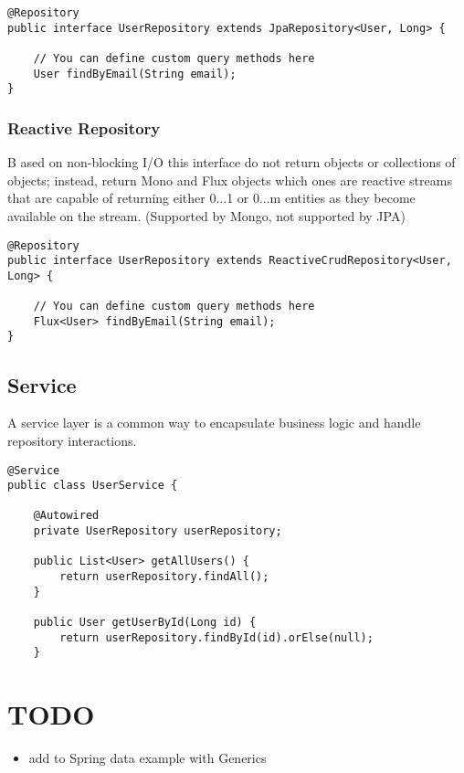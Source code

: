 \documentclass[a4paper, 12pt]{article}
\begin{document}
    \begin{lstlisting}
@Repository
public interface UserRepository extends JpaRepository<User, Long> {

    // You can define custom query methods here
    User findByEmail(String email);
}
    \end{lstlisting}

    \subsubsection{Reactive Repository}
    B ased on non-blocking I/O this interface do not
    return objects or collections of objects; instead, return Mono and Flux objects which ones are reactive streams that are
    capable of returning either 0...1 or 0...m entities as they become available on the stream. (Supported by Mongo, not supported by JPA)
    \begin{lstlisting}
@Repository
public interface UserRepository extends ReactiveCrudRepository<User, Long> {

    // You can define custom query methods here
    Flux<User> findByEmail(String email);
}
    \end{lstlisting}

    \subsection{Service}
    A service layer is a common way to encapsulate business logic and handle repository interactions.
    \begin{lstlisting}
@Service
public class UserService {

    @Autowired
    private UserRepository userRepository;

    public List<User> getAllUsers() {
        return userRepository.findAll();
    }

    public User getUserById(Long id) {
        return userRepository.findById(id).orElse(null);
    }
    \end{lstlisting}


    \section{TODO}
    \begin{itemize}
        \item add to Spring data example with Generics
    \end{itemize}
\end{document}
